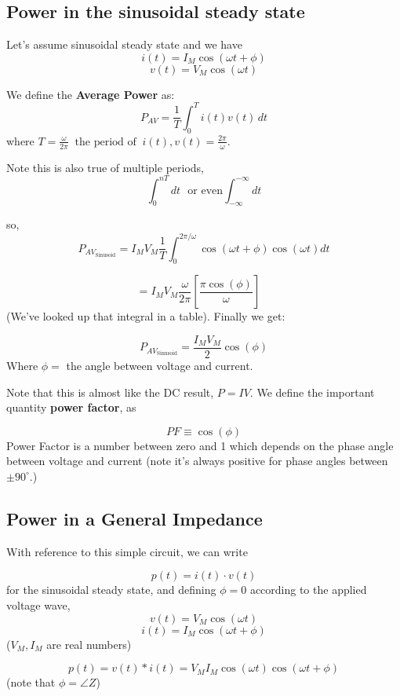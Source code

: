 \subsection{Power in the sinusoidal steady state}
Let's assume sinusoidal steady state and we have
\[
i(t) = I_M \cos(\omega t + \phi)
\]
\[
v(t) = V_M \cos(\omega t)
\]

\noindent We define the {\bf Average Power} as:
\[
P_{AV} = \frac{1}{T} \int_0^T i(t) v(t) \, dt
\]
where $T = \frac {\omega}  {2\pi}\;\; \text{the~period~of}  \;\; i(t), v(t) = \frac{2\pi}{\omega}$.


\noindent Note this is  also true of multiple periods,
\[
\int_0^{nT} dt \text{~~or~even} \int_{-\infty}^{-\infty}dt
\]



\noindent so,
\[
P_{AV_{\text{Sinusoid}}} = I_MV_M\frac{1}{T} \int_0^{2\pi/\omega}  \cos(\omega t + \phi) \cos(\omega t) dt
\]

\[
= I_M V_M \frac{\omega}{2\pi} \left[ \frac{\pi \cos(\phi)}{\omega} \right] \quad
\]
(We've looked up that integral in a table).   Finally we get:

\[
P_{AV_{\text{Sinusoid}}} = \frac{I_M V_M}{2} \cos(\phi)
\]
Where $ \phi = $ the angle between voltage and current.

Note that this is almost like the DC result, $P=IV$.   We
define the important quantity {\bf power factor}, as

\[
PF \equiv \cos(\phi)
\]
Power Factor is
a number between zero and 1 which depends on the phase angle between
voltage and current (note it's always positive for phase angles between
$\pm 90^\circ$.)


\subsection{Power in a General Impedance}

With reference to this simple circuit, we can write
%

\[
p(t) = i(t) \cdot v(t)
\]
for the sinusoidal steady state, and defining $\phi=0$ according
to the applied voltage wave,
\[
v(t) = V_M\cos(\omega t)
\]
\[
i(t) = I_M\cos(\omega t + \phi)
\]
($V_M, I_M$ are real numbers)

\[
p(t) = v(t)*i(t) = V_M I_M \cos(\omega t ) \cos(\omega t + \phi )
\]
(note that $\phi = \angle{Z}$)

